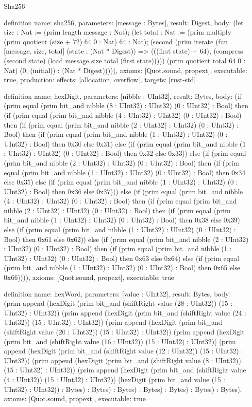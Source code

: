 \begin{lexlean}{Sha256}
\begin{semanticmodule}
definition{
  name: sha256,
  parameters: [message : Bytes],
  result: Digest,
  body: (let size : Nat := (prim length message : Nat); (let total : Nat := (prim multiply (prim quotient (size + 72) 64 0 : Nat) 64 : Nat); (second (prim iterate (fun [message, size, total] (state : (Nat * Digest)) => (((first state) + 64), (compress (second state) (load message size total (first state))))) (prim quotient total 64 0 : Nat) (0, (initial)) : (Nat * Digest))))),
  axioms: [Quot.sound, propext],
  executable: true,
  production: {effects: [allocation, overflow], targets: [rust-std]}
}

definition{
  name: hexDigit,
  parameters: [nibble : UInt32],
  result: Bytes,
  body: (if (prim equal (prim bit_and nibble (8 : UInt32) : UInt32) (0 : UInt32) : Bool) then (if (prim equal (prim bit_and nibble (4 : UInt32) : UInt32) (0 : UInt32) : Bool) then (if (prim equal (prim bit_and nibble (2 : UInt32) : UInt32) (0 : UInt32) : Bool) then (if (prim equal (prim bit_and nibble (1 : UInt32) : UInt32) (0 : UInt32) : Bool) then 0x30 else 0x31) else (if (prim equal (prim bit_and nibble (1 : UInt32) : UInt32) (0 : UInt32) : Bool) then 0x32 else 0x33)) else (if (prim equal (prim bit_and nibble (2 : UInt32) : UInt32) (0 : UInt32) : Bool) then (if (prim equal (prim bit_and nibble (1 : UInt32) : UInt32) (0 : UInt32) : Bool) then 0x34 else 0x35) else (if (prim equal (prim bit_and nibble (1 : UInt32) : UInt32) (0 : UInt32) : Bool) then 0x36 else 0x37))) else (if (prim equal (prim bit_and nibble (4 : UInt32) : UInt32) (0 : UInt32) : Bool) then (if (prim equal (prim bit_and nibble (2 : UInt32) : UInt32) (0 : UInt32) : Bool) then (if (prim equal (prim bit_and nibble (1 : UInt32) : UInt32) (0 : UInt32) : Bool) then 0x38 else 0x39) else (if (prim equal (prim bit_and nibble (1 : UInt32) : UInt32) (0 : UInt32) : Bool) then 0x61 else 0x62)) else (if (prim equal (prim bit_and nibble (2 : UInt32) : UInt32) (0 : UInt32) : Bool) then (if (prim equal (prim bit_and nibble (1 : UInt32) : UInt32) (0 : UInt32) : Bool) then 0x63 else 0x64) else (if (prim equal (prim bit_and nibble (1 : UInt32) : UInt32) (0 : UInt32) : Bool) then 0x65 else 0x66)))),
  axioms: [Quot.sound, propext],
  executable: true
}

definition{
  name: hexWord,
  parameters: [value : UInt32],
  result: Bytes,
  body: (prim append (hexDigit (prim bit_and (shiftRight value (28 : UInt32)) (15 : UInt32) : UInt32)) (prim append (hexDigit (prim bit_and (shiftRight value (24 : UInt32)) (15 : UInt32) : UInt32)) (prim append (hexDigit (prim bit_and (shiftRight value (20 : UInt32)) (15 : UInt32) : UInt32)) (prim append (hexDigit (prim bit_and (shiftRight value (16 : UInt32)) (15 : UInt32) : UInt32)) (prim append (hexDigit (prim bit_and (shiftRight value (12 : UInt32)) (15 : UInt32) : UInt32)) (prim append (hexDigit (prim bit_and (shiftRight value (8 : UInt32)) (15 : UInt32) : UInt32)) (prim append (hexDigit (prim bit_and (shiftRight value (4 : UInt32)) (15 : UInt32) : UInt32)) (hexDigit (prim bit_and value (15 : UInt32) : UInt32)) : Bytes) : Bytes) : Bytes) : Bytes) : Bytes) : Bytes) : Bytes),
  axioms: [Quot.sound, propext],
  executable: true
}


\end{semanticmodule}
\end{lexlean}
